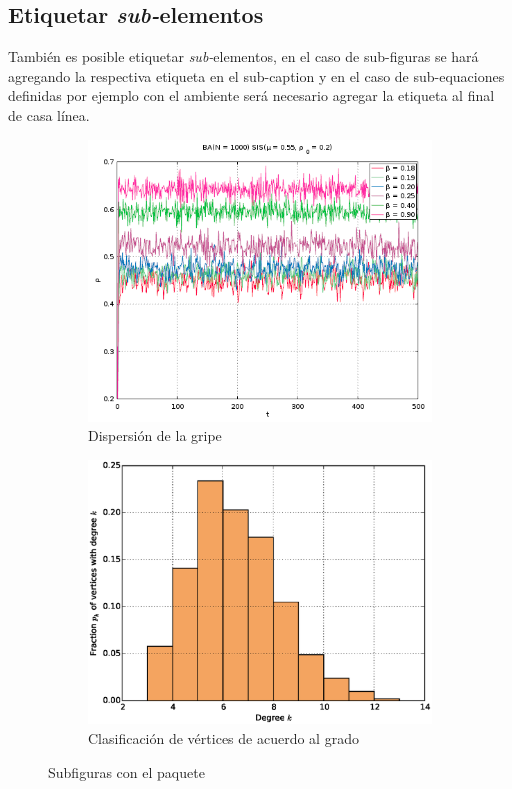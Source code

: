 \documentclass{article}
\begin{document}
\subsection{Etiquetar \emph{sub-}elementos}

También es posible etiquetar \emph{sub-}elementos, en el caso de sub-figuras se hará agregando la respectiva etiqueta en el sub-caption y en el caso de sub-equaciones definidas por ejemplo con el ambiente  será necesario agregar la etiqueta al final de casa línea.

\begin{figure}[ht]
	\centering
	\begin{subfigure}[t]{.475\textwidth}
		\centering
		\includegraphics[scale = .45]{BA_1000_u055_p_t_}
		\caption{Dispersión de la gripe} \label{gripe}
	\end{subfigure}
	\hfill
	\begin{subfigure}[t]{.475\textwidth}
		\centering
		\includegraphics[scale = .35]{histws1000}
		\caption{Clasificación de vértices de acuerdo al grado} \label{histograma}
	\end{subfigure}
	\caption{Subfiguras con el paquete }
\end{figure}
\end{document}

